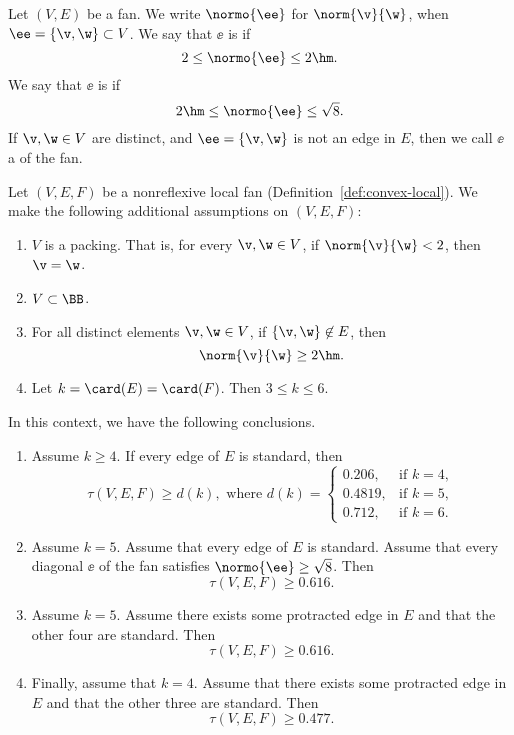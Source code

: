 \begin{definition} Let $(V,E)$ be a fan.  
We write $\normo{\ee}$ for $\norm{\v}{\w}$, when $\ee=\{\v,\w\}\subset V$.
We say that  $\ee$ is  if
\[
2\le \normo{\ee}\le2\hm.
\]
We say that  $\ee$ is  if
\[
2\hm\le \normo{\ee}\le\sqrt{8}.
\]
If $\v,\w\in V$ are distinct, and $\ee=\{\v,\w\}$ is not an edge in $E$, then
we call $\ee$ a  of the fan.
\end{definition}


\begin{theorem}\label{lemma:empty-d}
Let $(V,E,F)$ be a nonreflexive local fan (Definition~\ref{def:convex-local}).
We make the following additional
assumptions on $(V,E,F)$:
\begin{enumerate}
\item {} $V$ is a packing.  That is, for every $\v,\w\in
V$, if $\norm{\v}{\w}<2$, then $\v=\w$.
\item {} $V\subset \BB$.
\item {} For all distinct elements $\v,\w\in V$, if
$\{\v,\w\}\not\in E$, then 
\[ 
\norm{\v}{\w}\ge 2\hm.
\] 
\item {} 
Let   $k=\card(E)=\card(F)$.  Then $3\le k \le 6$.
\end{enumerate}
In this context, we have the following conclusions.
\begin{enumerate}
\item Assume $k\ge 4$.  If  every edge of $E$ is standard, then
\[ 
\tau(V,E,F) \ge d (k), \text{ where } d(k) =
\begin{cases}
  0.206,&\text{if }k=4,\\
  0.4819,&\text{if }k=5,\\
  0.712,&\text{if }k=6.
\end{cases}
\] 
\item Assume $k=5$.  Assume that every edge of $E$ is standard.
Assume that every diagonal $\ee$ of the fan satisfies $\normo{\ee}\ge\sqrt{8}$.
Then 
\[
\tau(V,E,F)\ge 0.616.
\]
\item Assume $k=5$.  Assume there exists some protracted edge in $E$ 
and that the other four are standard.  Then 
\[
\tau(V,E,F)\ge 0.616.
\]
\item Finally, assume that $k=4$.  Assume that there exists some protracted
 edge in $E$ and that the other three are standard.  Then
\[
\tau(V,E,F)\ge 0.477.
\]
\end{enumerate}
\end{theorem}

